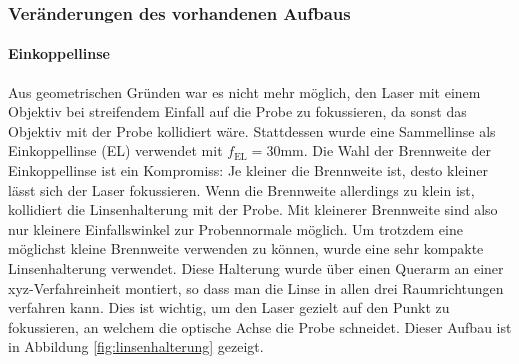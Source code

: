 \documentclass[titlepage,  ngerman]{article}
\begin{document}
	\subsubsection{Veränderungen des vorhandenen Aufbaus}
	\label{sec:OpticalChanges}
	\paragraph{Einkoppellinse}
	Aus geometrischen Gründen war es nicht mehr möglich, den Laser mit einem Objektiv bei streifendem Einfall auf die Probe zu fokussieren, da sonst das Objektiv mit der Probe kollidiert wäre. Stattdessen wurde eine Sammellinse als Einkoppellinse (EL) verwendet mit $f_{\mathrm{EL}}= 30\mathrm{mm}$. Die Wahl der Brennweite der Einkoppellinse ist ein Kompromiss: Je kleiner die Brennweite ist, desto kleiner lässt sich der Laser fokussieren. Wenn die Brennweite allerdings zu klein ist, kollidiert die Linsenhalterung mit der Probe. Mit kleinerer Brennweite sind also nur kleinere Einfallswinkel zur Probennormale möglich. Um trotzdem eine möglichst kleine Brennweite verwenden zu können, wurde eine sehr kompakte Linsenhalterung verwendet. Diese Halterung wurde über einen Querarm an einer xyz-Verfahreinheit montiert, so dass man die Linse in allen drei Raumrichtungen verfahren kann. Dies ist wichtig, um den Laser gezielt auf den Punkt zu fokussieren, an welchem die optische Achse die Probe schneidet. Dieser Aufbau ist in Abbildung \ref{fig:linsenhalterung} gezeigt.
\end{document}

